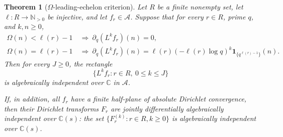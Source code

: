 \documentclass[11pt]{article}
\newtheorem{theorem}{Theorem}[section]
\theoremstyle{definition}
\theoremstyle{remark}
\newcommand{\C}{\mathbb C}
\newcommand{\N}{\mathbb N}
\newcommand{\cA}{\mathcal A}
\begin{document}
\begin{theorem}[\(\Omega\)-leading-echelon criterion]\label{thm:omega}
Let \(R\) be a finite nonempty set, let \(\ell:R\to\N_{>0}\) be injective, and let
\(f_r\in\cA\).  Suppose that for every \(r\in R\), prime \(q\), and \(k,n\geq0\),
\begin{align}
 \Omega(n)<\ell(r)-1
 &\ \Longrightarrow\ 
 \partial_q(L^kf_r)(n)=0,
 \label{eq:below}
 \tag{4.4}\\
 \Omega(n)=\ell(r)-1
 &\ \Longrightarrow\
 \partial_q(L^kf_r)(n)
 =\ell(r)(-\ell(r)\log q)^k
 \mathbf 1_{\{q^{\ell(r)-1}\}}(n).
 \label{eq:leading}
 \tag{4.5}
\end{align}
Then for every \(J\geq0\), the rectangle
\[
 \{L^kf_r:r\in R,\ 0\leq k\leq J\}
 \label{eq:jet-rectangle}
 \tag{4.6}
\]
is algebraically independent over \(\C\) in \(\cA\).

If, in addition, all \(f_r\) have a finite half-plane of absolute Dirichlet convergence, then
their Dirichlet transforms \(F_r\) are jointly differentially algebraically independent over
\(\C(s)\): the set \(\{F_r^{(k)}:r\in R,k\geq0\}\) is algebraically independent over
\(\C(s)\).
\end{theorem}
\end{document}
